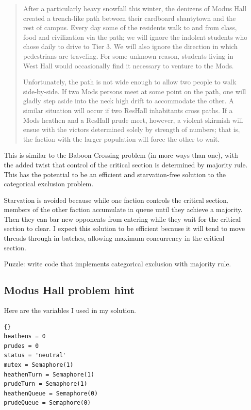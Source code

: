 \documentclass{book}
\newcommand{\clearemptydoublepage}{\newpage\cleardoublepage}
\begin{document}
\begin{quote}
After a particularly heavy snowfall this winter, the denizens of Modus
Hall created a trench-like path between their cardboard shantytown and
the rest of campus.  Every day some of the residents walk to and from
class, food and civilization via the path; we will ignore the
indolent students who chose daily to drive to Tier 3.  We will also
ignore the direction in which pedestrians are traveling.  For some
unknown reason, students living in West Hall would occasionally find it
necessary to venture to the Mods.

Unfortunately, the path is not wide enough to allow two people
to walk side-by-side.  If two Mods persons meet at some point on the
path, one will gladly step aside into the neck high drift to accommodate
the other.  A similar situation will occur if two ResHall inhabitants
cross paths.  If a Mods heathen and a ResHall prude meet, however, a
violent skirmish will ensue with the victors determined solely by
strength of numbers; that is, the faction with the larger population will
force the other to wait.
\end{quote}

This is similar to the Baboon Crossing problem (in more ways than
one), with the added twist that control of the critical section is
determined by majority rule.  This has the potential to be an
efficient and starvation-free solution to the categorical exclusion
problem.

Starvation is avoided because while one faction controls the critical
section, members of the other faction accumulate in queue until they
achieve a majority.  Then they can bar new opponents from entering
while they wait for the critical section to clear.  I expect this
solution to be efficient because it will tend to move threads through
in batches, allowing maximum concurrency in the critical section.

Puzzle: write code that implements categorical exclusion with
majority rule.



\clearemptydoublepage
\subsection {Modus Hall problem hint}

Here are the variables I used in my solution.

\begin{latin}
\begin{lstlisting}[title={Modus problem hint}]{}
heathens = 0
prudes = 0
status = 'neutral'
mutex = Semaphore(1)
heathenTurn = Semaphore(1)
prudeTurn = Semaphore(1)
heathenQueue = Semaphore(0)
prudeQueue = Semaphore(0)
\end{lstlisting}
\end{latin}
\end{document}
